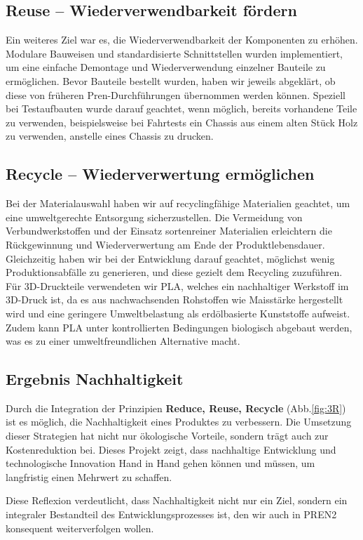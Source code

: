 \documentclass[../main.tex]{subfiles}
\begin{document}
\subsection{Reuse – Wiederverwendbarkeit fördern}

Ein weiteres Ziel war es, die Wiederverwendbarkeit der Komponenten zu erhöhen. Modulare Bauweisen und standardisierte Schnittstellen wurden implementiert, um eine einfache Demontage und Wiederverwendung einzelner Bauteile zu ermöglichen. Bevor Bauteile bestellt wurden, haben wir jeweils abgeklärt, ob diese von früheren Pren-Durchführungen übernommen werden können. Speziell bei Testaufbauten wurde darauf geachtet, wenn möglich, bereits vorhandene Teile zu verwenden, beispielsweise bei Fahrtests ein Chassis aus einem alten Stück Holz zu verwenden, anstelle eines Chassis zu drucken.

\subsection{Recycle – Wiederverwertung ermöglichen}

Bei der Materialauswahl haben wir auf recyclingfähige Materialien geachtet, um eine umweltgerechte Entsorgung sicherzustellen. Die Vermeidung von Verbundwerkstoffen und der Einsatz sortenreiner Materialien erleichtern die Rückgewinnung und Wiederverwertung am Ende der Produktlebensdauer. Gleichzeitig haben wir bei der Entwicklung darauf geachtet, möglichst wenig Produktionsabfälle zu generieren, und diese gezielt dem Recycling zuzuführen. Für 3D-Druckteile verwendeten wir PLA, welches ein nachhaltiger Werkstoff im 3D-Druck ist, da es aus nachwachsenden Rohstoffen wie Maisstärke hergestellt wird und eine geringere Umweltbelastung als erdölbasierte Kunststoffe aufweist. Zudem kann PLA unter kontrollierten Bedingungen biologisch abgebaut werden, was es zu einer umweltfreundlichen Alternative macht.

\subsection{Ergebnis Nachhaltigkeit}

Durch die Integration der Prinzipien \textbf{Reduce, Reuse, Recycle} (Abb.\ref{fig:3R}) ist es möglich, die Nachhaltigkeit eines Produktes zu verbessern. Die Umsetzung dieser Strategien hat nicht nur ökologische Vorteile, sondern trägt auch zur Kostenreduktion bei. Dieses Projekt zeigt, dass nachhaltige Entwicklung und technologische Innovation Hand in Hand gehen können und müssen, um langfristig einen Mehrwert zu schaffen.

Diese Reflexion verdeutlicht, dass Nachhaltigkeit nicht nur ein Ziel, sondern ein integraler Bestandteil des Entwicklungsprozesses ist, den wir auch in PREN2 konsequent weiterverfolgen wollen.
\end{document}
